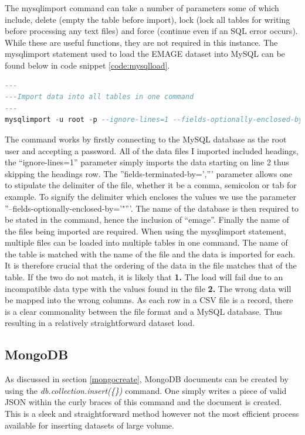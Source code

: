 The mysqlimport command can take a number of parameters some of which include, delete (empty the table before import), lock (lock all tables for writing before processing any text files) and force (continue even if an SQL error occurs). While these are useful functions, they are not required in this instance. The mysqlimport statement used to load the EMAGE dataset into MySQL can be found below in code snippet \ref{code:mysqlload}.
\begin{lstlisting}[language=SQL, caption=Command used to load data into the MySQL database., label=code:mysqlload]
---
---Import data into all tables in one command
---
mysqlimport -u root -p --ignore-lines=1 --fields-optionally-enclosed-by='"' --fields-terminated-by=',' emage assays.csv publications.csv sources.csv specimens.csv stages.csv textannotations.csv genes.csv anatomystructures.csv
\end{lstlisting}
\parindent 0pt
The command works by firstly connecting to the MySQL database as the root user and accepting a password. All of the data files I imported included headings, the ``ignore-lines=1'' parameter simply imports the data starting on line 2 thus skipping the headings row. The ''fields-terminated-by=',''' parameter allows one to stipulate the delimiter of the file, whether it be a comma, semicolon or tab for example. To signify the delimiter which encloses the values we use the parameter ''--fields-optionally-enclosed-by='"'''. The name of the database is then required to be stated in the command, hence the inclusion of ``emage''. Finally the name of the files being imported are required. When using the mysqlimport statement, multiple files can be loaded into multiple tables in one command. The name of the table is matched with the name of the file and the data is imported for each. It is therefore crucial that the ordering of the data in the file matches that of the table. If the two do not match, it is likely that \textbf{1.} The load will fail due to an incompatible data type with the values found in the file \textbf{2.} The wrong data will be mapped into the wrong columns. As each row in a CSV file is a record, there is a clear commonality between the file format and a MySQL database. Thus resulting in a relatively straightforward dataset load.
\parindent 15pt

\subsection{MongoDB}\label{mongoload}
As discussed in section \ref{mongocreate}, MongoDB documents can be created by using the \textit{db.collection.insert(\{\})} command. One simply writes a piece of valid JSON within the curly braces of this command and the document is created. This is a sleek and straightforward method however not the most efficient process available for inserting datasets of large volume.


